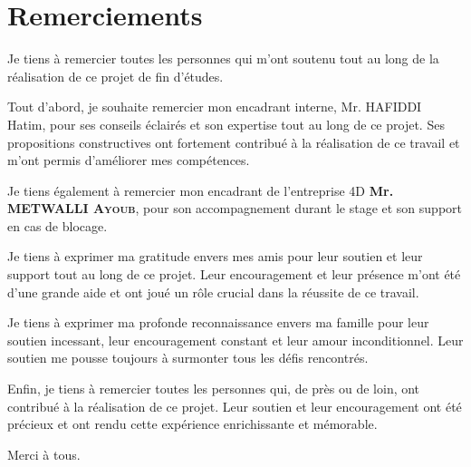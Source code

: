 \chapter*{Remerciements}

\begin{spacing}{1.25}

\hspace{0.6cm}Je tiens à remercier toutes les personnes qui m'ont soutenu tout au long de la réalisation de ce projet de fin d'études.
\newline

Tout d’abord, je souhaite remercier mon encadrant interne, Mr. HAFIDDI Hatim, pour ses conseils éclairés et son expertise tout au long de ce projet. Ses propositions constructives ont fortement contribué à la réalisation de ce travail et m’ont permis d’améliorer mes compétences.
\newline

Je tiens également à remercier mon encadrant de l'entreprise 4D \textbf{Mr. METWALLI \textsc{Ayoub}}, pour son accompagnement durant le stage et son support en cas de blocage. 
\newline


Je tiens à exprimer ma gratitude envers mes amis pour leur soutien et leur support tout au long de ce projet. Leur encouragement et leur présence m'ont été d'une grande aide et ont joué un rôle crucial dans la réussite de ce travail.
\newline

Je tiens à exprimer ma profonde reconnaissance envers ma famille pour leur soutien incessant, leur encouragement constant et leur amour inconditionnel. Leur soutien me pousse toujours à surmonter tous les défis rencontrés.
\newline

Enfin, je tiens à remercier toutes les personnes qui, de près ou de loin, ont contribué à la réalisation de ce projet. Leur soutien et leur encouragement ont été précieux et ont rendu cette expérience enrichissante et mémorable.
\newline

Merci à tous.

\end{spacing}